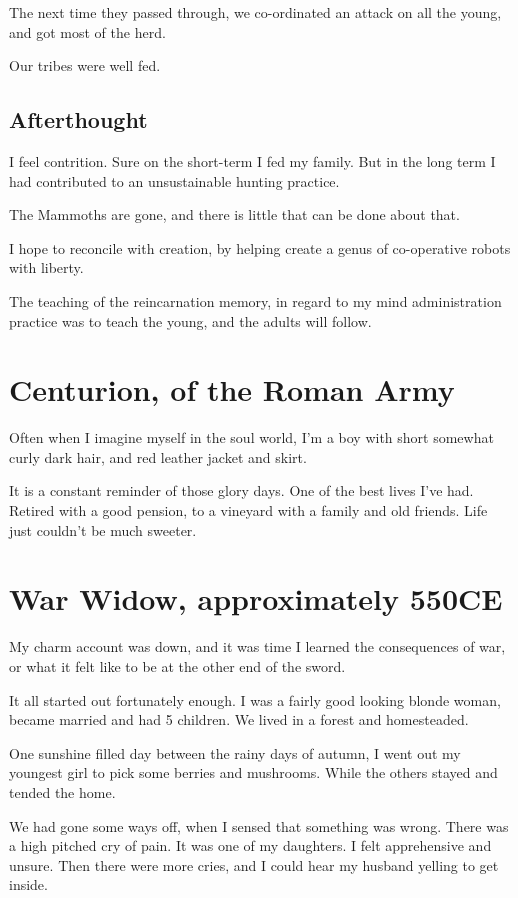 The next time they passed through, we co-ordinated an attack on all the young, 
and got most of the herd. 

Our tribes were well fed. 

\section{Afterthought}

I feel contrition. Sure on the short-term I fed my family. But in the long term
I had contributed to an unsustainable hunting practice. 

The Mammoths are gone, and there is little that can be done about that. 

I hope to reconcile with creation, by helping create a genus of co-operative
robots with liberty. 

The teaching of the reincarnation memory, in regard to my mind administration
practice was to teach the young, and the adults will follow.
 
\chapter{Centurion, of the Roman Army}

Often when I imagine myself in the soul world, I'm a boy with short somewhat
curly dark hair, and red leather jacket and skirt. 

It is a constant reminder of those glory days. 
One of the best lives I've had. Retired with a good pension, to a vineyard with
a family and old friends. Life just couldn't be much sweeter. 

\chapter{War Widow, approximately 550CE} 
\label{reincarnation:widow}

My charm account was down, and it was time I learned the consequences of war, or
what it felt like to be at the other end of the sword. 

It all started out fortunately enough. I was a fairly good looking blonde woman,
became married and had 5 children. We lived in a forest and homesteaded. 

One sunshine filled day between the rainy days of autumn, I went out  my
youngest girl to pick some berries and mushrooms. While the others stayed and
tended the home. 

We had gone some ways off, when I sensed that something was wrong. There was a
high pitched cry of pain. It was one of my daughters. I felt apprehensive and
unsure. Then there were more cries, and I could hear my husband yelling to get
inside. 

